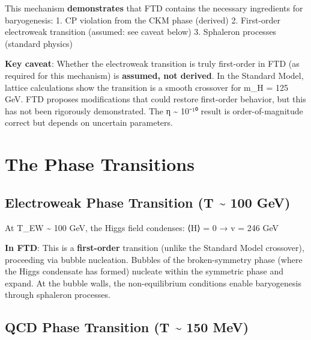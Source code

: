 \documentclass[
  11pt,
  letterpaper,
  twoside,
  openright]{book}
\begin{document}
\begin{tcolorbox}[enhanced jigsaw, coltitle=black, colbacktitle=quarto-callout-warning-color!10!white, toprule=.15mm, colframe=quarto-callout-warning-color-frame, arc=.35mm, opacityback=0, bottomtitle=1mm, toptitle=1mm, breakable, colback=white, titlerule=0mm, opacitybacktitle=0.6, title=\textcolor{quarto-callout-warning-color}{\faExclamationTriangle}\hspace{0.5em}{Epistemic Status: Baryogenesis}, rightrule=.15mm, bottomrule=.15mm, leftrule=.75mm, left=2mm]

This mechanism \textbf{demonstrates} that FTD contains the necessary
ingredients for baryogenesis: 1. CP violation from the CKM phase
(derived) 2. First-order electroweak transition (assumed: see caveat
below) 3. Sphaleron processes (standard physics)

\textbf{Key caveat}: Whether the electroweak transition is truly
first-order in FTD (as required for this mechanism) is \textbf{assumed,
not derived}. In the Standard Model, lattice calculations show the
transition is a smooth crossover for m\_H = 125 GeV. FTD proposes
modifications that could restore first-order behavior, but this has not
been rigorously demonstrated. The η \textasciitilde{} 10⁻¹⁰ result is
order-of-magnitude correct but depends on uncertain parameters.

\end{tcolorbox}

\section{The Phase Transitions}\label{the-phase-transitions}

\subsection{Electroweak Phase Transition (T \textasciitilde{} 100
GeV)}\label{electroweak-phase-transition-t-100-gev}

At T\_EW \textasciitilde{} 100 GeV, the Higgs field condenses: ⟨H⟩ = 0 →
v = 246 GeV

\textbf{In FTD}: This is a \textbf{first-order} transition (unlike the
Standard Model crossover), proceeding via bubble nucleation. Bubbles of
the broken-symmetry phase (where the Higgs condensate has formed)
nucleate within the symmetric phase and expand. At the bubble walls, the
non-equilibrium conditions enable baryogenesis through sphaleron
processes.

\subsection{QCD Phase Transition (T \textasciitilde{} 150
MeV)}\label{qcd-phase-transition-t-150-mev}
\end{document}
